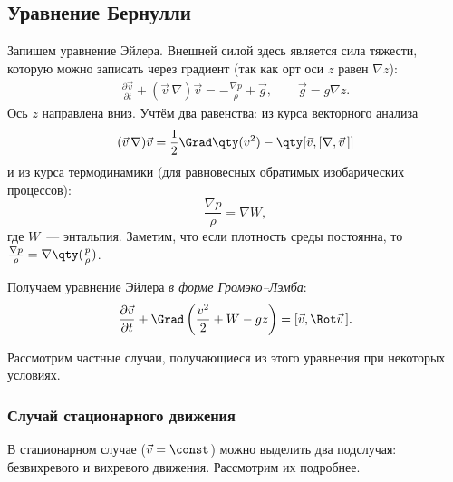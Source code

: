 \subsection{Уравнение Бернулли}
Запишем уравнение Эйлера. Внешней силой здесь является сила тяжести, которую можно записать через градиент (так как орт оси $z$ равен $\nabla z$):
\begin{equation}\begin{aligned}
\frac { \partial \vec{v} } { \partial t } + ( \vec{v}\,\nabla ) \vec{v} = - \frac { \nabla p } { \rho } + \vec { g }, \qquad
\vec { g } = g \nabla z.
\end{aligned}\end{equation}
Ось $z$ направлена вниз. Учтём два равенства: из курса векторного анализа
\begin{equation}
	(\vec {v}\, \nabla ) \vec{v} = \frac12\Grad\qty(v^2) - \qty[ \vec{v} , [\nabla , \vec{v}\,]]
\end{equation}
 и из курса термодинамики (для равновесных обратимых изобарических процессов):
\begin{equation}
\frac { \nabla p } { \rho } = \nabla W,
\end{equation}
где $W$~--- энтальпия. Заметим, что если плотность среды постоянна, то $\frac{\nabla p}{\rho}=\nabla\qty(\frac{p}{\rho})$.

Получаем уравнение Эйлера \textit{в форме Громэко--Лэмба}:
\begin{equation}
\frac { \partial \vec{v} } { \partial t } +\Grad \left( \frac { v^2 } { 2 } + W - g z \right) = [ \vec{v} , \Rot \vec{v}\,].
\end{equation}

Рассмотрим частные случаи, получающиеся из этого уравнения при некоторых условиях.

\subsubsection{Случай стационарного движения}
В стационарном случае ($\vec{v}=\const$\!) можно выделить два подслучая: безвихревого и вихревого движения. Рассмотрим их подробнее.

